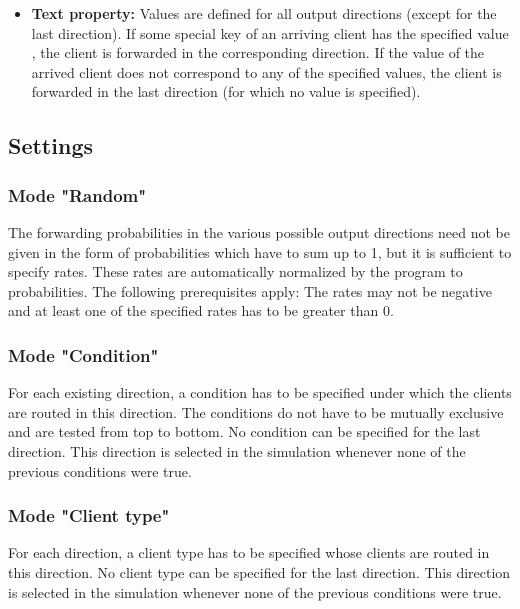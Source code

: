 \begin{itemize}
  \item 
    \textbf{Text property:}
    Values are defined for all output directions (except for the last direction).
    If some special key of an arriving client has the specified value , the client
    is forwarded in the corresponding direction.
    If the value of the arrived client does not correspond to any of the specified values,
    the client is forwarded in the last direction (for which no value is specified).

\end{itemize}

\subsection*{Settings}

\subsubsection*{Mode "Random"}

The forwarding probabilities in the various possible output directions need not be given in the form
of probabilities which have to sum up to 1, but it is sufficient to specify rates. These rates are
automatically normalized by the program to probabilities. The following prerequisites apply:
The rates may not be negative and at least one of the specified rates has to be greater than 0.

\subsubsection*{Mode "Condition"}

For each existing direction, a condition has to be specified under which the clients are routed in this
direction. The conditions do not have to be mutually exclusive and are tested from top to bottom.
No condition can be specified for the last direction. This direction is selected in the simulation
whenever none of the previous conditions were true.

\subsubsection*{Mode "Client type"}

For each direction, a client type has to be specified whose clients are routed in this direction.
No client type can be specified for the last direction. This direction is selected in the simulation
whenever none of the previous conditions were true.

